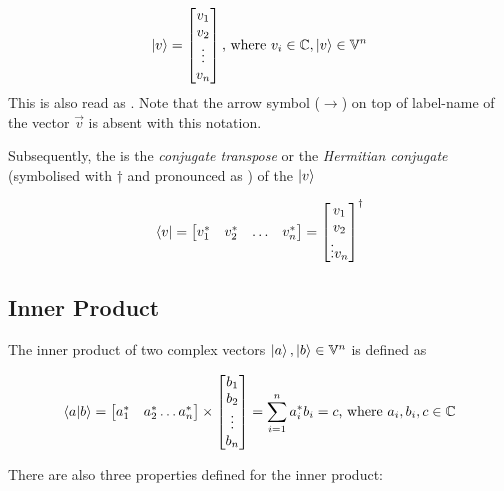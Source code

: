 \begin{equation}
    \ket{v}=\begin{bmatrix}
        v_1\\
        v_2\\
        \vdots\\
        v_n
    \end{bmatrix}
    \text{, where }v_i\in\mathbb{C},\ket{v}\in\mathbb{V}^n
\end{equation}
This is also read as . Note that the arrow symbol ($\rightarrow$) on top of label-name of the vector
$\vec{v}$ is absent with this notation.

Subsequently, the  is the \textit{conjugate transpose} or the \textit{Hermitian conjugate} (symbolised with
$\dag$ and pronounced as ) of the $\ket{v}$

\begin{equation}
    \bra{v}=\begin{bmatrix}
        v_1^*&v_2^*&\hdots&v_n^*
    \end{bmatrix}=
    \begin{bmatrix}
        v_1\\
        v_2\\
        \vdots
        v_n
    \end{bmatrix}^\dag
\end{equation}

\subsection{Inner Product}

The inner product of two complex vectors $\ket{a},\ket{b}\in\mathbb{V}^n$ is defined as

\begin{equation}
    \braket{a|b}=\begin{bmatrix}
        a_1^*&a_2^*\hdots a_n^*
    \end{bmatrix}\times
    \begin{bmatrix}
        b_1\\
        b_2\\
        \vdots\\
        b_n
    \end{bmatrix}=
    \sum_{i=1}^{n}a_i^*b_i=c\text{, where }a_i,b_i,c\in\mathbb{C}
\end{equation}

There are also three properties defined for the inner product:

